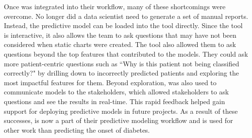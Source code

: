 Once \prospector was integrated into their workflow, many of these shortcomings were overcome.  No longer did a data scientist need to generate a set of manual reports.  Instead, the predictive model can be loaded into the tool directly.  Since the tool is interactive, it also allows the team to ask questions that may have not been considered when static charts were created.  The tool also allowed them to ask questions beyond the top features that contributed to the models.  They could ask more patient-centric questions such as ``Why is this patient not being classified correctly?" by drilling down to incorrectly predicted patients and exploring the most impactful features for them. Beyond exploration, \prospector was also used to communicate models to the stakeholders, which allowed stakeholders to ask questions and see the results in real-time.  This rapid feedback helped gain support for deploying predictive models in future projects.  As a result of these successes, \prospector is now a part of their predictive modeling workflow and is used for other work than predicting the onset of diabetes.




